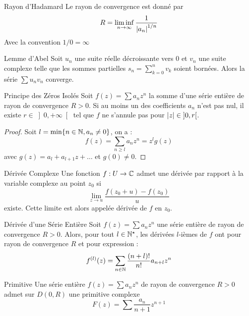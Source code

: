 \documentclass{cours}
\begin{document}
\begin{propositionfr}{Rayon d'Hadamard}{}
    Le rayon de convergence est donné par 
    \[
        R = \liminf_{n \to \infty}\frac{1}{\left|a_{n}\right|^{1/n}}
    \]
    Avec la convention $1/0 = \infty$
\end{propositionfr}

\begin{lemme}{Lemme d'Abel}{}
    Soit $u_{n}$ une suite réelle décroissante vers $0$ et $v_{n}$ une suite complexe telle que les sommes partielles $s_{n} = \sum_{k = 0}^{n} v_{k}$ soient bornées. Alors la série $\sum u_{n}v_{n}$ converge.
\end{lemme}

\begin{propositionfr}{Principe des Zéros Isolés}{}
    Soit $f(z) = \sum a_{n}z^{n}$ la somme d'une série entière de rayon de convergence $R > 0$. Si au moins un des coefficients $a_{n}$ n'est pas nul, il existe $r \in \left] 0, +\infty\right[$ tel que $f$ ne s'annule pas pour $\left|z\right| \in \left]0, r\right[$.
\end{propositionfr}
\begin{proof}
    Soit $l = \min \{n \in \mathbb{N}, a_{n} \neq 0\}$, on a : 
    \[
        f(z) = \sum_{n \geq l} a_{n}z^{n} = z^{l}g(z)
    \]
    avec $g(z) = a_{l} + a_{l + 1}z + \ldots$ et $g(0) \neq 0$. 
\end{proof}

\begin{définition}{Dérivée Complexe}{}
    Une fonction $f : U \to \mathbb{C}$ admet une dérivée par rapport à la variable complexe au point $z_{0}$ si
    \[
        \lim_{z \to u} \frac{f(z_{0} + u)- f(z_{0})}{u}
    \]
    existe. Cette limite est alors appelée dérivée de $f$ en $z_{0}$.
\end{définition}

\begin{propositionfr}{Dérivée d'une Série Entière}{}
    Soit $f(z) = \sum a_{n}z^{n}$ une série entière de rayon de convergence $R > 0$. Alors, pour tout $l \in \mathbb{N}^{\star}$, les dérivées $l$-ièmes de $f$ ont pour rayon de convergence $R$ et pour expression : 
    \[
        f^{(l)}(z) = \sum_{n \in \mathbb{N}}\frac{(n + l)!}{n!}a_{n + l}z^{n}  
    \]
\end{propositionfr}

\begin{corollaire}{Primitive}{}
    Une série entière $f(z) = \sum a_{n}z^{n}$ de rayon de convergence $R > 0$ admet sur $D(0, R)$ une primitive complexe
    \[
        F(z) = \sum \frac{a_{n}}{n + 1}z^{n + 1}
    \]
\end{corollaire}
\end{document}
